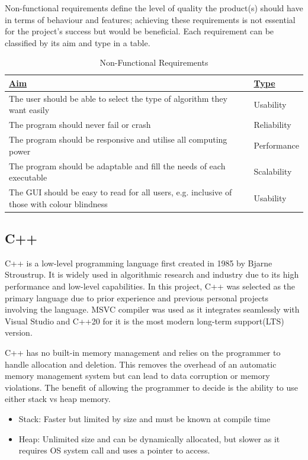 Non-functional requirements define the level of quality the product(s) should have in terms of behaviour and features; achieving these requirements is not essential for the project's success but would be beneficial. Each requirement can be classified by its aim and type in a table.
\vspace{0.4cm}
\begin{table}[!ht]
    \centering
    \renewcommand{\arraystretch}{1.2} %
    \begin{tabularx}{\textwidth}{|X|p{3cm}|}
    \hline
{\ul \textbf{Aim}}                                                                         & {\ul \textbf{Type}} \\ \hline
The user should be able to select the type of algorithm they want easily                   & Usability           \\ \hline
The program should never fail or crash                                                     & Reliability         \\ \hline
The program should be responsive and utilise all computing power                           & Performance         \\ \hline
The program should be adaptable and fill the needs of each executable                      & Scalability         \\ \hline
The GUI should be easy to read for all users, e.g. inclusive of those with colour blindness & Usability           \\ \hline
    \end{tabularx}
    \caption{Non-Functional Requirements}
    \label{tab:nonfunctionalreq}
\end{table}

\subsection{C++}
\label{sec:c++}
C++ is a low-level programming language first created in 1985 by Bjarne Stroustrup\cite{stroustrup2013cpp}. It is widely used in algorithmic research and industry due to its high performance and low-level capabilities. In this project, C++ was selected as the primary language due to prior experience and previous personal projects involving the language. MSVC\cite{visualstudio_cpp} compiler was used as it integrates seamlessly with Visual Studio and C++20\cite{cppreference_cpp20} for it is the most modern long-term support(LTS) version.

C++ has no built-in memory management and relies on the programmer to handle allocation and deletion. This removes the overhead of an automatic memory management system but can lead to data corruption or memory violations. The benefit of allowing the programmer to decide is the ability to use either stack vs heap memory.
\begin{itemize}
    \item Stack: Faster but limited by size and must be known at compile time
    \item Heap: Unlimited size and can be dynamically allocated, but slower as it requires OS system call and uses a pointer to access.
\end{itemize}

